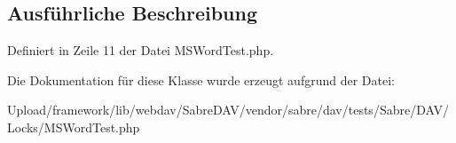 \subsection{Ausführliche Beschreibung}


Definiert in Zeile 11 der Datei M\+S\+Word\+Test.\+php.



Die Dokumentation für diese Klasse wurde erzeugt aufgrund der Datei\+:\begin{DoxyCompactItemize}
\item 
Upload/framework/lib/webdav/\+Sabre\+D\+A\+V/vendor/sabre/dav/tests/\+Sabre/\+D\+A\+V/\+Locks/M\+S\+Word\+Test.\+php\end{DoxyCompactItemize}
